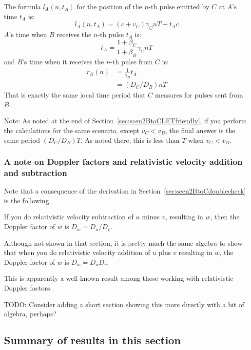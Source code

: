 \documentclass[a4paper]{article}
\theoremstyle{plain}
\theoremstyle{definition}
\begin{document}
The formula $l_A(n,t_A)$ for the position of the $n$-th pulse emitted
by $C$ at $A$'s time $t_A$ is:
\begin{equation}
l_A(n, t_A) = (c + v_C) \gamma_C nT - t_A c
\end{equation}
$A$'s time when $B$ receives the $n$-th pulse $t_A$ is:
\begin{equation}
t_A = \frac{1 + \beta_C}{1 + \beta_B} \gamma_C nT
\end{equation}
and $B$'s time when it receives the $n$-th pulse from $C$ is:
\begin{align*}
r_B(n) & = \frac{1}{\gamma_B} t_A \\
       & = ( D_C / D_B ) nT
\end{align*}
That is exactly the same local time period that $C$ measures for
pulses sent from $B$.

Note: As noted at the end of Section~\ref{sec:scen2BtoCLETfriendly},
if you perform the calculations for the same scenario, except $v_C < v_B$,
the final answer is the same period $(D_C / D_B) T$.  As noted there,
this is less than $T$ when $v_C < v_B$.


\subsubsection{A note on Doppler factors and relativistic velocity addition and subtraction}
\label{sec:dopplerfactorsandvelocity}

Note that a consequence of the derivation in
Section~\ref{sec:scen2BtoCdoublecheck} is the following.

If you do relativistic velocity subtraction of $u$ minus $v$,
resulting in $w$, then the Doppler factor of $w$ is $D_w = D_u / D_v$.

Although not shown in that section, it is pretty much the same algebra
to show that when you do relativistic velocity addition of $u$ plus
$v$ resulting in $w$, the Doppler factor of $w$ is $D_w = D_u D_v$.

This is apparently a well-known result among those working with
relativistic Doppler factors.

TODO: Consider adding a short section showing this more directly with
a bit of algebra, perhaps?


\subsection{Summary of results in this section}
\label{sec:summary}
\end{document}

